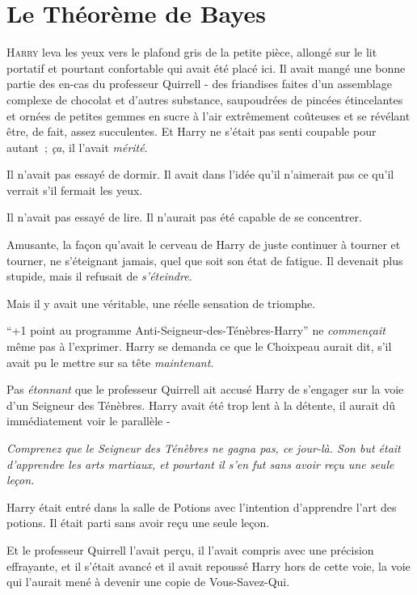 \chapter{Le Théorème de Bayes}

\lettrine{H}{arry} leva les yeux vers le plafond gris de la petite pièce, allongé sur le lit portatif et pourtant confortable qui avait été placé ici. Il avait mangé une bonne partie des en-cas du professeur Quirrell - des friandises faites d'un assemblage complexe de chocolat et d'autres substance, saupoudrées de pincées étincelantes et ornées de petites gemmes en sucre à l'air extrêmement coûteuses et se révélant être, de fait, assez succulentes. Et Harry ne s'était pas senti coupable pour autant~; \emph{ça}, il l'avait \emph{mérité}.

Il n'avait pas essayé de dormir. Il avait dans l'idée qu'il n'aimerait pas ce qu'il verrait s'il fermait les yeux.

Il n'avait pas essayé de lire. Il n'aurait pas été capable de se concentrer.

Amusante, la façon qu'avait le cerveau de Harry de juste continuer à tourner et tourner, ne s'éteignant jamais, quel que soit son état de fatigue. Il devenait plus stupide, mais il refusait de \emph{s'éteindre}.

Mais il y avait une véritable, une réelle sensation de triomphe.

“+1 point au programme Anti-Seigneur-des-Ténèbres-Harry” ne \emph{commençait} même pas à l'exprimer. Harry se demanda ce que le Choixpeau aurait dit, s'il avait pu le mettre sur sa tête \emph{maintenant}.

Pas \emph{étonnant} que le professeur Quirrell ait accusé Harry de s'engager sur la voie d'un Seigneur des Ténèbres. Harry avait été trop lent à la détente, il aurait dû immédiatement voir le parallèle -

\emph{Comprenez que le Seigneur des Ténèbres ne gagna pas, ce jour-là. Son but était d'apprendre les arts martiaux, et pourtant il s'en fut sans avoir reçu une seule leçon.}

Harry était entré dans la salle de Potions avec l'intention d'apprendre l'art des potions. Il était parti sans avoir reçu une seule leçon.

Et le professeur Quirrell l'avait perçu, il l'avait compris avec une précision effrayante, et il s'était avancé et il avait repoussé Harry hors de cette voie, la voie qui l'aurait mené à devenir une copie de Vous-Savez-Qui.

